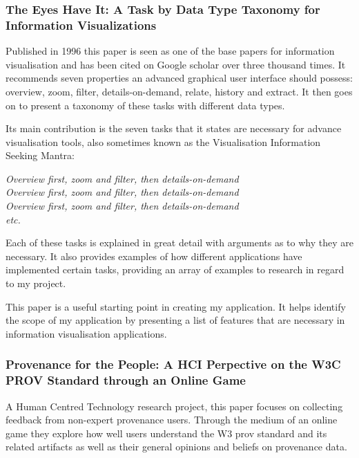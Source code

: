 \subsubsection{The Eyes Have It: A Task by Data Type Taxonomy for Information Visualizations\cite{Shneiderman1996}}
\label{sub:the_eyes_have_it_a_task_by_data_type_taxonomy_}

Published in 1996 this paper is seen as one of the base papers for information visualisation and has been cited on Google scholar over three thousand times. It recommends seven properties an advanced graphical user interface should possess: overview, zoom, filter, details-on-demand, relate, history and extract. It then goes on to present a taxonomy of these tasks with different data types.

Its main contribution is the seven tasks that it states are necessary for advance visualisation tools, also sometimes known as the Visualisation Information Seeking Mantra:

\textit{Overview first, zoom and filter, then details-on-demand}\\
\textit{Overview first, zoom and filter, then details-on-demand}\\
\textit{Overview first, zoom and filter, then details-on-demand}\\
\textit{etc.}

Each of these tasks is explained in great detail with arguments as to why they are necessary. It also provides examples of how different applications have implemented certain tasks, providing an array of examples to research in regard to my project.

This paper is a useful starting point in creating my application. It helps identify the scope of my application by presenting a list of features that are necessary in information visualisation applications.

\subsubsection{Provenance for the People: A HCI Perpective on the W3C PROV Standard through an Online Game\cite{Bachour2015}}
\label{sub:provenance_for_the_people_a_hci_perpective_on_the_w3c_prov_standard_through_an_online_game}

A Human Centred Technology research project, this paper focuses on collecting feedback from non-expert provenance users. Through the medium of an online game they explore how well users understand the W3 prov standard\cite{primer2013} and its related artifacts as well as their general opinions and beliefs on provenance data.

